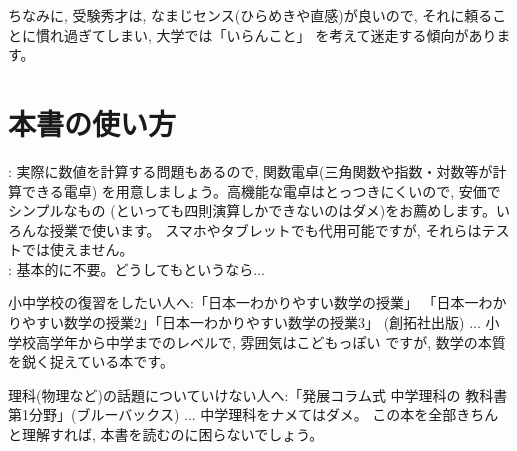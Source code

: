ちなみに, 受験秀才は, なまじセンス(ひらめきや直感)が良いので, 
それに頼ることに慣れ過ぎてしまい, 大学では「いらんこと」
を考えて迷走する傾向があります。

\section*{本書の使い方}

: 
実際に数値を計算する問題もあるので, 関数電卓(三角関数や指数・対数等が計算できる電卓)
を用意しましょう。高機能な電卓はとっつきにくいので, 安価でシンプルなもの
(といっても四則演算しかできないのはダメ)をお薦めします。いろんな授業で使います。
スマホやタブレットでも代用可能ですが, それらはテストでは使えません。\\

: 基本的に不要。どうしてもというなら...

小中学校の復習をしたい人へ:「日本一わかりやすい数学の授業」
「日本一わかりやすい数学の授業2」「日本一わかりやすい数学の授業3」
(創拓社出版) ... 小学校高学年から中学までのレベルで, 雰囲気はこどもっぽい
ですが, 数学の本質を鋭く捉えている本です。

理科(物理など)の話題についていけない人へ:「発展コラム式 中学理科の
教科書 第1分野」(ブルーバックス) ... 中学理科をナメてはダメ。
この本を全部きちんと理解すれば, 本書を読むのに困らないでしょう。\\


